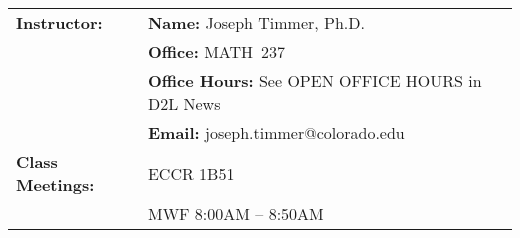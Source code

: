 \documentclass[11pt]{article}
\begin{document}
\begin{longtable}{lp{5.2in}}
%
\textbf{Instructor:}
      & {\bf Name:}         \hspace{8.00ex} Joseph Timmer, Ph.D.
     \\
      & {\bf Office:}       \hspace{8.25ex} MATH~237
     \\
      & {\bf Office Hours:} \hspace{.20ex} See OPEN OFFICE HOURS in D2L News
     \\
      & {\bf Email:}        \hspace{8.00ex} joseph.timmer@colorado.edu
     \\[6pt]
%

\textbf{Class Meetings:}
     &    ECCR 1B51
     \\
     &    MWF 8:00\/AM -- 8:50\/AM 
   \\[6pt]


\end{longtable}
\end{document}
